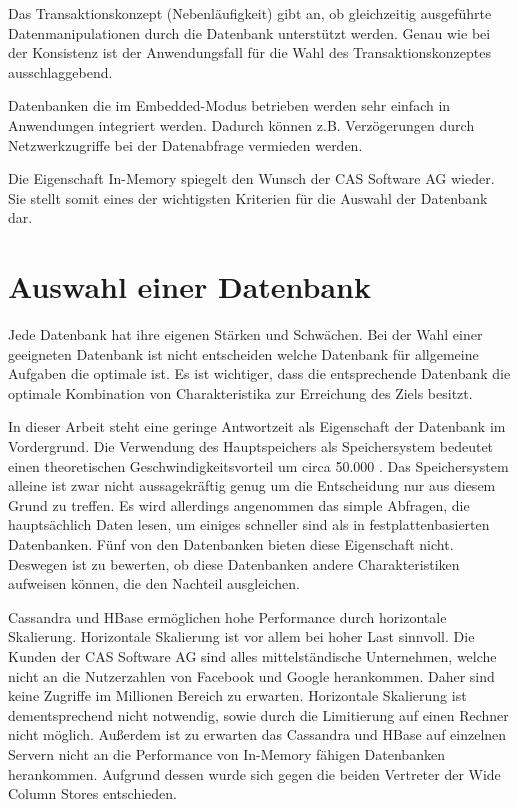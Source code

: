 Das Transaktionskonzept (Nebenläufigkeit) gibt an, ob gleichzeitig ausgeführte Datenmanipulationen durch die Datenbank unterstützt werden. Genau wie bei der Konsistenz ist der Anwendungsfall für die Wahl des Transaktionskonzeptes ausschlaggebend.   

Datenbanken die im Embedded-Modus betrieben werden sehr einfach in Anwendungen integriert werden. Dadurch können z.B. Verzögerungen durch Netzwerkzugriffe bei der Datenabfrage vermieden werden. 

Die Eigenschaft In-Memory spiegelt den Wunsch der CAS Software AG wieder. Sie stellt somit eines der  wichtigsten Kriterien für die Auswahl der Datenbank dar.

\section{Auswahl einer Datenbank}
\label{ch:AnalyseDatenbanken:sec:Ergebniss}

Jede Datenbank hat ihre eigenen Stärken und Schwächen. Bei der Wahl einer geeigneten Datenbank ist nicht entscheiden welche Datenbank für allgemeine Aufgaben die optimale ist. Es ist wichtiger, dass die entsprechende Datenbank die optimale Kombination von Charakteristika zur Erreichung des Ziels besitzt.

In dieser Arbeit steht eine geringe Antwortzeit als Eigenschaft der Datenbank im Vordergrund. Die Verwendung des Hauptspeichers als Speichersystem bedeutet einen theoretischen Geschwindigkeitsvorteil um circa 50.000 \cite{SWB-394434307}.
Das Speichersystem alleine ist zwar nicht aussagekräftig genug um die Entscheidung nur aus diesem Grund zu treffen. Es wird allerdings angenommen das simple Abfragen, die hauptsächlich Daten lesen, um einiges schneller sind als in festplattenbasierten Datenbanken. Fünf von den Datenbanken bieten diese Eigenschaft nicht. Deswegen ist zu bewerten, ob diese Datenbanken andere Charakteristiken aufweisen können, die den Nachteil ausgleichen.

Cassandra und HBase ermöglichen hohe Performance durch horizontale Skalierung. Horizontale Skalierung ist vor allem bei hoher Last sinnvoll. Die Kunden der CAS Software AG sind alles mittelständische Unternehmen, welche nicht an die Nutzerzahlen von Facebook und Google herankommen. Daher sind keine Zugriffe im Millionen Bereich zu erwarten. Horizontale Skalierung ist dementsprechend nicht notwendig, sowie durch die Limitierung auf einen Rechner nicht möglich. Außerdem ist zu erwarten das Cassandra und HBase auf einzelnen Servern nicht an die Performance von In-Memory fähigen Datenbanken herankommen. Aufgrund dessen wurde sich gegen die beiden Vertreter der Wide Column Stores entschieden.

